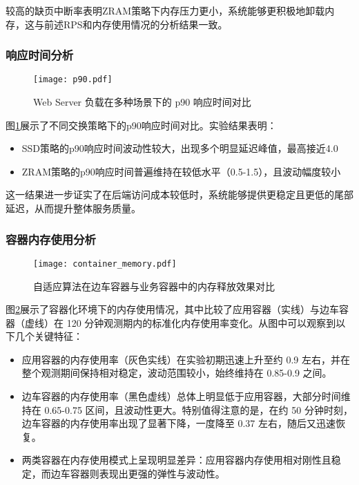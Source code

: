 较高的缺页中断率表明ZRAM策略下内存压力更小，系统能够更积极地卸载内存，这与前述RPS和内存使用情况的分析结果一致。

\subsubsection{响应时间分析}
\begin{figure}[htb]
    \centering
    \texttt{[image: p90.pdf]}
    \caption{Web Server 负载在多种场景下的 p90 响应时间对比}
    \label{fig:p90}
\end{figure}
图\ref{fig:p90}展示了不同交换策略下的p90响应时间对比。实验结果表明：
\begin{itemize}
    \item SSD策略的p90响应时间波动性较大，出现多个明显延迟峰值，最高接近4.0
    \item ZRAM策略的p90响应时间普遍维持在较低水平（0.5-1.5），且波动幅度较小
\end{itemize}

这一结果进一步证实了在后端访问成本较低时，系统能够提供更稳定且更低的尾部延迟，从而提升整体服务质量。


\subsubsection{容器内存使用分析}
\begin{figure}[htbp]
    \centering
    \texttt{[image: container\_memory.pdf]}
    \caption{自适应算法在边车容器与业务容器中的内存释放效果对比}
    \label{fig:container_memory}
\end{figure}
图\ref{fig:container_memory}展示了容器化环境下的内存使用情况，其中比较了应用容器（实线）与边车容器（虚线）在 120 分钟观测期内的标准化内存使用率变化。从图中可以观察到以下几个关键特征：
\begin{itemize}
    \item 应用容器的内存使用率（灰色实线）在实验初期迅速上升至约 0.9 左右，并在整个观测期间保持相对稳定，波动范围较小，始终维持在 0.85-0.9 之间。
    \item 边车容器的内存使用率（黑色虚线）总体上明显低于应用容器，大部分时间维持在 0.65-0.75 区间，且波动性更大。特别值得注意的是，在约 50 分钟时刻，边车容器的内存使用率出现了显著下降，一度降至 0.37 左右，随后又迅速恢复。
    \item 两类容器在内存使用模式上呈现明显差异：应用容器内存使用相对刚性且稳定，而边车容器则表现出更强的弹性与波动性。
\end{itemize}

